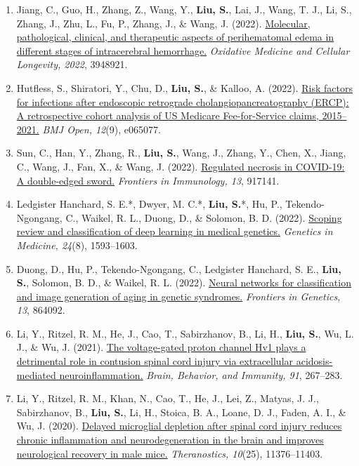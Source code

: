 \documentclass[10pt,letterpaper]{article}
\newcommand{\publication}[2][]{%
  \Needspace{2\baselineskip}%
  \item[#1] {\interlinepenalty=10000 #2\par}%
}
\begin{document}
\begin{enumerate}[leftmargin=2.7em,labelsep=0.6em]
\publication[J-7]{Jiang, C., Guo, H., Zhang, Z., Wang, Y., \textbf{Liu, S.}, Lai, J., Wang, T. J., Li, S., Zhang, J., Zhu, L., Fu, P., Zhang, J., \& Wang, J. (2022). \href{https://doi.org/10.1155/2022/3948921}{Molecular, pathological, clinical, and therapeutic aspects of perihematomal edema in different stages of intracerebral hemorrhage.} \emph{Oxidative Medicine and Cellular Longevity, 2022}, 3948921.}
\publication[J-6]{Hutfless, S., Shiratori, Y., Chu, D., \textbf{Liu, S.}, \& Kalloo, A. (2022). \href{https://doi.org/10.1136/bmjopen-2022-065077}{Risk factors for infections after endoscopic retrograde cholangiopancreatography (ERCP): A retrospective cohort analysis of US Medicare Fee-for-Service claims, 2015--2021.} \emph{BMJ Open, 12}(9), e065077.}
\publication[J-5]{Sun, C., Han, Y., Zhang, R., \textbf{Liu, S.}, Wang, J., Zhang, Y., Chen, X., Jiang, C., Wang, J., Fan, X., \& Wang, J. (2022). \href{https://doi.org/10.3389/fimmu.2022.917141}{Regulated necrosis in COVID-19: A double-edged sword.} \emph{Frontiers in Immunology, 13}, 917141.}
\publication[J-4]{Ledgister Hanchard, S. E.*, Dwyer, M. C.*, \textbf{Liu, S.}*, Hu, P., Tekendo-Ngongang, C., Waikel, R. L., Duong, D., \& Solomon, B. D. (2022). \href{https://doi.org/10.1016/j.gim.2022.04.025}{Scoping review and classification of deep learning in medical genetics.} \emph{Genetics in Medicine, 24}(8), 1593--1603.}
\publication[J-3]{Duong, D., Hu, P., Tekendo-Ngongang, C., Ledgister Hanchard, S. E., \textbf{Liu, S.}, Solomon, B. D., \& Waikel, R. L. (2022). \href{https://doi.org/10.3389/fgene.2022.864092}{Neural networks for classification and image generation of aging in genetic syndromes.} \emph{Frontiers in Genetics, 13}, 864092.}
\publication[J-2]{Li, Y., Ritzel, R. M., He, J., Cao, T., Sabirzhanov, B., Li, H., \textbf{Liu, S.}, Wu, L. J., \& Wu, J. (2021). \href{https://doi.org/10.1016/j.bbi.2020.10.005}{The voltage-gated proton channel Hv1 plays a detrimental role in contusion spinal cord injury via extracellular acidosis-mediated neuroinflammation.} \emph{Brain, Behavior, and Immunity, 91}, 267--283.}
\publication[J-1]{Li, Y., Ritzel, R. M., Khan, N., Cao, T., He, J., Lei, Z., Matyas, J. J., Sabirzhanov, B., \textbf{Liu, S.}, Li, H., Stoica, B. A., Loane, D. J., Faden, A. I., \& Wu, J. (2020). \href{https://doi.org/10.7150/thno.49199}{Delayed microglial depletion after spinal cord injury reduces chronic inflammation and neurodegeneration in the brain and improves neurological recovery in male mice.} \emph{Theranostics, 10}(25), 11376--11403.}
\end{enumerate}
\end{document}

